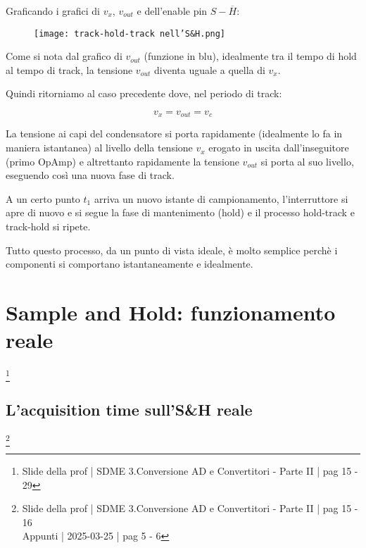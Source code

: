 Graficando i grafici di $v_x$, $v_{out}$ e dell'enable pin $S - \overline{H}$: 

\begin{figure}[h]
    \centering
    \texttt{[image: track-hold-track nell'S\&H.png]}
\end{figure}

Come si nota dal grafico di $v_{out}$ (funzione in blu), idealmente tra il tempo di hold al tempo di track, 
la tensione $v_{out}$ diventa uguale a quella di $v_x$. \newline 

Quindi ritorniamo al caso precedente dove, nel periodo di track: 

{
    \Large 
    \begin{equation}
        v_x = v_{out} = v_c
    \end{equation}
}

La tensione ai capi del condensatore si porta rapidamente (idealmente lo fa in maniera istantanea) 
al livello della tensione $v_x$ erogato in uscita dall'inseguitore (primo OpAmp) e altrettanto rapidamente la tensione $v_{out}$ 
si porta al suo livello, eseguendo così una nuova fase di track. \newline 

A un certo punto $t_1$ arriva un nuovo istante di campionamento, l'interruttore si apre di nuovo e si segue la fase 
di mantenimento (hold) e il processo hold-track e track-hold si ripete. \newline 

Tutto questo processo, da un punto di vista ideale, è molto semplice perchè i componenti si comportano istantaneamente e idealmente. \newline 

\newpage 


\section{Sample and Hold: funzionamento reale} 
\footnote{Slide della prof | SDME 3.Conversione AD e Convertitori - Parte II | pag 15 - 29 } 

\subsection{L'acquisition time sull'S\&H reale} 
\footnote{Slide della prof | SDME 3.Conversione AD e Convertitori - Parte II | pag 15 - 16 \\  
Appunti | 2025-03-25 | pag 5 - 6} 

